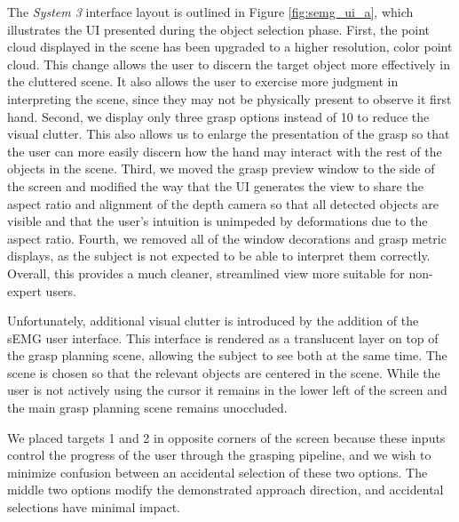 The \emph{System 3} interface layout is outlined in Figure \ref{fig:semg_ui_a}, which illustrates the UI presented during the object selection phase. First, the point cloud displayed in the scene has been upgraded to a higher resolution, color point cloud. This change allows the user to discern the target object more effectively in the cluttered scene. It also allows the user to exercise more judgment in interpreting the scene, since they may not be physically present to observe it first hand. Second, we display only three grasp options instead of 10 to reduce the visual clutter. This also allows us to enlarge the presentation of the grasp so that the user can more easily discern how the hand may interact with the rest of the objects in the scene. Third, we moved the grasp preview window to the side of the screen and modified the way that the UI generates the view to share the aspect ratio and alignment of the depth camera so that all detected objects are visible and that the user's intuition is unimpeded by deformations due to the aspect ratio. Fourth, we removed all of the window decorations and grasp metric displays, as the subject is not expected to be able to interpret them correctly. Overall, this provides a much cleaner, streamlined view more suitable for non-expert users. 

Unfortunately, additional visual clutter is introduced by the addition of the sEMG user interface. This interface is rendered as a translucent layer on top of the grasp planning scene, allowing the subject to see both at the same time. The scene is chosen so that the relevant objects are centered in the scene. While the user is not actively using the cursor it remains in the lower left of the screen and the main grasp planning scene remains unoccluded. 

We placed targets 1 and 2 in opposite corners of the screen because these inputs control the progress of the user through the grasping pipeline, and we wish to minimize confusion between an accidental selection of these two options. The middle two options modify the demonstrated approach direction, and accidental selections have minimal impact. 


